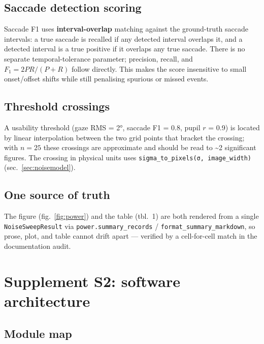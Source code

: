 \documentclass[
]{article}
\begin{document}
\subsection{Saccade detection scoring}\label{saccade-detection-scoring}

Saccade F1 uses \textbf{interval-overlap} matching against the
ground-truth saccade intervals: a true saccade is recalled if any
detected interval overlaps it, and a detected interval is a true
positive if it overlaps any true saccade. There is no separate
temporal-tolerance parameter; precision, recall, and \(F_1 = 2PR/(P+R)\)
follow directly. This makes the score insensitive to small onset/offset
shifts while still penalising spurious or missed events.

\subsection{Threshold crossings}\label{threshold-crossings}

A usability threshold (gaze RMS = 2°, saccade F1 = 0.8, pupil \(r\) =
0.9) is located by linear interpolation between the two grid points that
bracket the crossing; with \(n=25\) these crossings are approximate and
should be read to \textasciitilde2 significant figures. The crossing in
physical units uses \texttt{sigma\_to\_pixels(σ,\ image\_width)}
(sec.~\ref{sec:noisemodel}).

\subsection{One source of truth}\label{one-source-of-truth}

The figure (fig.~\ref{fig:power}) and the table (tbl.~1)
are both rendered from a single \texttt{NoiseSweepResult} via
\texttt{power.summary\_records} / \texttt{format\_summary\_markdown}, so
prose, plot, and table cannot drift apart --- verified by a
cell-for-cell match in the documentation audit.

\section{Supplement S2: software architecture}\label{sec:software}

\subsection{Module map}\label{module-map}
\end{document}
